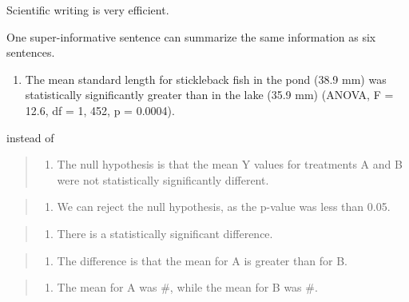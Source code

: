 \documentclass[twoside, 12pt]{article}
\providecommand{\tightlist}{%
  \setlength{\itemsep}{0pt}\setlength{\parskip}{0pt}}
\begin{document}
Scientific writing is very efficient.

One super-informative sentence can summarize the same information as six
sentences.

\begin{enumerate}
\def\labelenumi{\arabic{enumi}.}
\tightlist
\item
  The mean standard length for stickleback fish in the pond (38.9 mm)
  was statistically significantly greater than in the lake (35.9 mm)
  (ANOVA, F = 12.6, df = 1, 452, p = 0.0004).
\end{enumerate}

instead of

\begin{quote}
\begin{enumerate}
\def\labelenumi{\arabic{enumi}.}
\tightlist
\item
  The null hypothesis is that the mean Y values for treatments A and B
  were not statistically significantly different.
\end{enumerate}
\end{quote}

\begin{quote}
\begin{enumerate}
\def\labelenumi{\arabic{enumi}.}
\setcounter{enumi}{1}
\tightlist
\item
  We can reject the null hypothesis, as the p-value was less than 0.05.
\end{enumerate}
\end{quote}

\begin{quote}
\begin{enumerate}
\def\labelenumi{\arabic{enumi}.}
\setcounter{enumi}{2}
\tightlist
\item
  There is a statistically significant difference.
\end{enumerate}
\end{quote}

\begin{quote}
\begin{enumerate}
\def\labelenumi{\arabic{enumi}.}
\setcounter{enumi}{3}
\tightlist
\item
  The difference is that the mean for A is greater than for B.
\end{enumerate}
\end{quote}

\begin{quote}
\begin{enumerate}
\def\labelenumi{\arabic{enumi}.}
\setcounter{enumi}{4}
\tightlist
\item
  The mean for A was \#, while the mean for B was \#.
\end{enumerate}
\end{quote}
\end{document}
